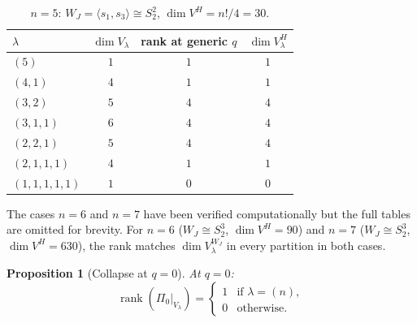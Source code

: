 \documentclass[12pt]{article}
\newtheorem{proposition}[theorem]{Proposition}
\theoremstyle{remark}
\theoremstyle{definition}
\begin{document}
\begin{table}[h]
\centering
\caption{$n = 5$: $W_J = \langle s_1, s_3 \rangle \cong S_2^2$, $\dim V^H = n!/4 = 30$.}
\label{tab:n5}
\begin{tabular}{@{}lccc@{}}
\toprule
$\lambda$ & $\dim V_\lambda$ & rank at generic $q$ & $\dim V_\lambda^H$ \\
\midrule
$(5)$         & $1$  & $1$  & $1$  \\
$(4,1)$       & $4$  & $1$  & $1$  \\
$(3,2)$       & $5$  & $4$  & $4$  \\
$(3,1,1)$     & $6$  & $4$  & $4$  \\
$(2,2,1)$     & $5$  & $4$  & $4$  \\
$(2,1,1,1)$   & $4$  & $1$  & $1$  \\
$(1,1,1,1,1)$ & $1$  & $0$  & $0$  \\
\bottomrule
\end{tabular}
\end{table}

The cases $n = 6$ and $n = 7$ have been verified computationally but the full tables are
omitted for brevity.  For $n = 6$ ($W_J \cong S_2^3$, $\dim V^H = 90$) and $n = 7$
($W_J \cong S_2^3$, $\dim V^H = 630$), the rank matches $\dim V_\lambda^{W_J}$ in every
partition in both cases.


\begin{proposition}[Collapse at $q = 0$]
\label{prop:q0}
At $q = 0$:
\[
  \operatorname{rank}(\Pi_0|_{V_\lambda}) =
  \begin{cases} 1 & \text{if } \lambda = (n), \\ 0 & \text{otherwise.} \end{cases}
\]
\end{proposition}
\end{document}
